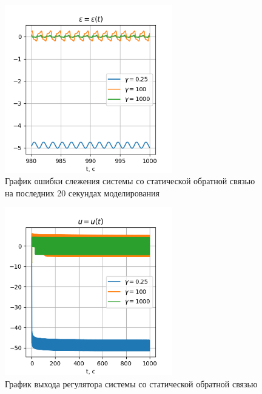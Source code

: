 \documentclass{article}
\begin{document}
\begin{figure}[h!]
  \centering
  \includegraphics[width=0.65\textwidth]{figs/2_epsilon_small.png}
  \caption{График ошибки слежения системы со статической обратной связью на последних 20 секундах моделирования} 
  \label{fig:2_epsilon_small}
\end{figure}

\begin{figure}[h!]
  \centering
  \includegraphics[width=0.65\textwidth]{figs/2_u.png}
  \caption{График выхода регулятора системы со статической обратной связью} 
  \label{fig:2_u}
\end{figure}
\end{document}

